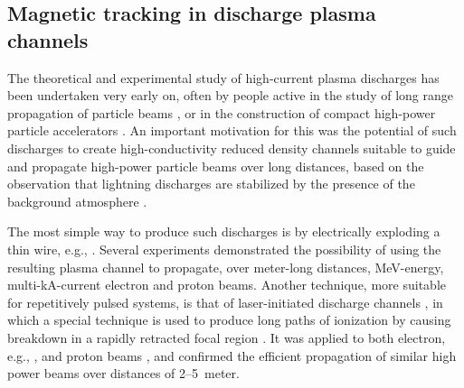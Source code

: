 \documentclass [12pt,a4paper,     ]{report} %
\begin{document}
\subsection{Magnetic tracking in discharge plasma channels}

The theoretical and experimental study of high-current plasma discharges has been undertaken very early on, often by people active in the study of long range propagation of particle beams \cite{MANHE1973-}, or in the construction of compact high-power particle accelerators \cite{PAVLO1975-}.  An important motivation for this was the potential of such discharges to create high-conductivity reduced density channels suitable to guide and propagate high-power particle beams over long distances, based on the observation that lightning discharges are stabilized by the presence of the background atmosphere \cite{MANHE1973-}.

   The most simple way to produce such discharges is by electrically exploding a thin wire, e.g., \cite{PAVLO1975-}.  Several experiments demonstrated the possibility of using the resulting plasma channel to propagate, over meter-long distances, MeV-energy, multi-kA-current electron \cite{MILLE1977-} and proton \cite{OTTIN1979-, OLSEN1980-} beams.  Another technique, more suitable for repetitively pulsed systems, is that of laser-initiated discharge channels \cite{GREIG1978}, in which a special technique is used to produce long paths of ionization by causing breakdown in a rapidly retracted focal region \cite{WEYL-1979-}.  It was applied to both electron, e.g., \cite{MURPH1987-}, and proton beams \cite{OLSEN1982-, OZAKI1985-, NERI-1993-}, and confirmed the efficient propagation of similar high power beams over distances of 2--5~meter.
\end{document}
